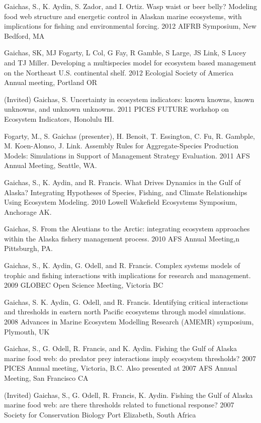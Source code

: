 \documentclass[11pt, a4paper]{awesome-cv}
\begin{document}
Gaichas, S., K. Aydin, S. Zador, and I. Ortiz. Wasp waist or beer belly?
Modeling food web structure and energetic control in Alaskan marine
ecosystems, with implications for fishing and environmental forcing.
2012 AIFRB Symposium, New Bedford, MA

Gaichas, SK, MJ Fogarty, L Col, G Fay, R Gamble, S Large, JS Link, S
Lucey and TJ Miller. Developing a multispecies model for ecosystem based
management on the Northeast U.S. continental shelf. 2012 Ecologial
Society of America Annual meeting, Portland OR

(Invited) Gaichas, S. Uncertainty in ecosystem indicators: known knowns,
known unknowns, and unknown unknowns. 2011 PICES FUTURE workshop on
Ecosystem Indicators, Honolulu HI.

Fogarty, M., S. Gaichas (presenter), H. Benoit, T. Essington, C. Fu, R.
Gambple, M. Koen-Alonso, J. Link. Assembly Rules for Aggregate-Species
Production Models: Simulations in Support of Management Strategy
Evaluation. 2011 AFS Annual Meeting, Seattle, WA.

Gaichas, S., K. Aydin, and R. Francis. What Drives Dynamics in the Gulf
of Alaska? Integrating Hypotheses of Species, Fishing, and Climate
Relationships Using Ecosystem Modeling. 2010 Lowell Wakefield Ecosystems
Symposium, Anchorage AK.

Gaichas, S. From the Aleutians to the Arctic: integrating ecosystem
approaches within the Alaska fishery management process. 2010 AFS Annual
Meeting,n Pittsburgh, PA.

Gaichas, S., K. Aydin, G. Odell, and R. Francis. Complex systems models
of trophic and fishing interactions with implications for research and
management. 2009 GLOBEC Open Science Meeting, Victoria BC

Gaichas, S. K. Aydin, G. Odell, and R. Francis. Identifying critical
interactions and thresholds in eastern north Pacific ecosystems through
model simulations. 2008 Advances in Marine Ecosystem Modelling Research
(AMEMR) symposium, Plymouth, UK

Gaichas, S., G. Odell, R. Francis, and K. Aydin. Fishing the Gulf of
Alaska marine food web: do predator prey interactions imply ecosystem
thresholds? 2007 PICES Annual meeting, Victoria, B.C. Also presented at
2007 AFS Annual Meeting, San Francisco CA

(Invited) Gaichas, S., G. Odell, R. Francis, K. Aydin. Fishing the Gulf
of Alaska marine food web: are there thresholds related to functional
response? 2007 Society for Conservation Biology Port Elizabeth, South
Africa
\end{document}
